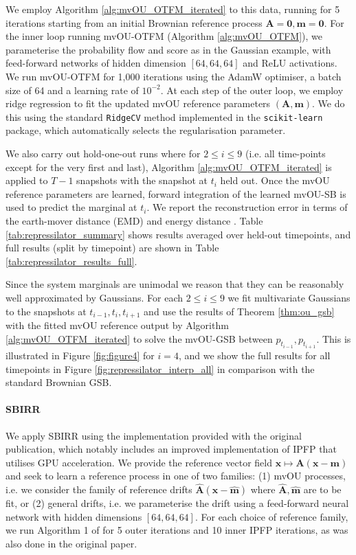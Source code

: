 \documentclass{article}
\theoremstyle{newstyle}
\begin{document}
We employ Algorithm \ref{alg:mvOU_OTFM_iterated} to this data, running for 5 iterations starting from an initial Brownian reference process $\bm{A} = \bm{0}, \bm{m} = \bm{0}$. For the inner loop running mvOU-OTFM (Algorithm \ref{alg:mvOU_OTFM}), we parameterise the probability flow and score as in the Gaussian example, with feed-forward networks of hidden dimension $[64, 64, 64]$ and ReLU activations. We run mvOU-OTFM for 1,000 iterations using the AdamW optimiser, a batch size of 64 and a learning rate of $10^{-2}$. At each step of the outer loop, we employ ridge regression to fit the updated mvOU reference parameters $(\bm{A}, \bm{m})$. We do this using the standard \texttt{RidgeCV} method implemented in the \texttt{scikit-learn} package, which automatically selects the regularisation parameter.  

We also carry out hold-one-out runs where for $2 \leq i \leq 9$ (i.e. all time-points except for the very first and last), Algorithm \ref{alg:mvOU_OTFM_iterated} is applied to $T-1$ snapshots with the snapshot at $t_i$ held out. Once the mvOU reference parameters are learned, forward integration of the learned mvOU-SB is used to predict the marginal at $t_i$. We report the reconstruction error in terms of the earth-mover distance (EMD) and energy distance \cite{rizzo2016energy}. Table \ref{tab:repressilator_summary} shows results averaged over held-out timepoints, and full results (split by timepoint) are shown in Table \ref{tab:repressilator_results_full}. 

Since the system marginals are unimodal we reason that they can be reasonably well approximated by Gaussians. For each $2 \leq i \leq 9$ we fit multivariate Gaussians to the snapshots at $t_{i-1}, t_i, t_{i+1}$ and use the results of Theorem \ref{thm:ou_gsb} with the fitted mvOU reference output by Algorithm \ref{alg:mvOU_OTFM_iterated} to solve the mvOU-GSB between $p_{t_{i-1}}, p_{t_{i+1}}$. This is illustrated in Figure \ref{fig:figure4} for $i = 4$, and we show the full results for all timepoints in Figure \ref{fig:repressilator_interp_all} in comparison with the standard Brownian GSB. 

\paragraph{SBIRR}  We apply SBIRR \cite{shen2024multi} using the implementation provided with the original publication, which notably includes an improved implementation of IPFP \cite{vargas2021solving} that utilises GPU acceleration. We provide the reference vector field $\bm{x} \mapsto \bm{A} (\bm{x} - \bm{m})$ and seek to learn a reference process in one of two families: (1) mvOU processes, i.e. we consider the family of reference drifts $\hat{\bm{A}} (\bm{x} - \hat{\bm{m}})$ where $\hat{\bm{A}}, \hat{\bm{m}}$ are to be fit, or (2) general drifts, i.e. we parameterise the drift using a feed-forward neural network with hidden dimensions $[64, 64, 64]$. For each choice of reference family, we run Algorithm 1 of \cite{shen2024multi} for 5 outer iterations and 10 inner IPFP iterations, as was also done in the original paper. 
\end{document}
